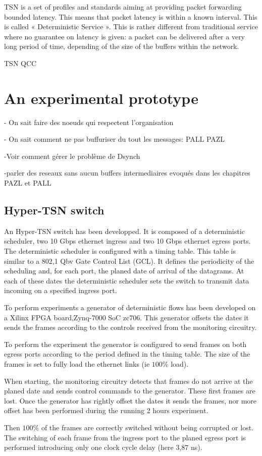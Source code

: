 \label{sec:TSNqbv}
 TSN is a set of profiles and standards aiming at providing packet forwarding bounded latency. This means that packet latency is within a known interval. This is called « Deterministic Service ». This is rather different from traditional service where no guarantee on latency is given: a packet can be delivered after a very long period of time, depending of the size of the buffers within the network.


 TSN QCC
\section{An experimental prototype}
\label{sec:platform}
- On sait faire des noeuds qui respectent l'organisation

- On sait comment ne pas buffuriser du tout les messages: PALL PAZL

-Voir comment gérer le problème de Dsynch

-parler des reseaux sans aucun buffers intermediaires evoqués dans les chapitres PAZL et PALL
\subsection{Hyper-TSN switch}

An Hyper-TSN switch has been developped. It is composed of a deterministic scheduler, two 10 Gbps ethernet ingress and two 10 Gbps ethernet egress ports. The deterministic scheduler is configured with a timing table. This table is similar to a 802,1 Qbv Gate Control List (GCL). It defines the periodicity of the scheduling and, for each port, the planed date of arrival of the datagrams. At each of these dates the deterministic scheduler sets the switch to transmit data incoming on a specified ingress port.

To perform experiments a generator of deterministic flows has been developed on a Xilinx FPGA board,Zynq-7000 SoC zc706. This generator offsets the dates it sends the frames according to the controls received from the monitoring circuitry.

To perform the experiment the generator is configured to send frames on both egress ports according to the period defined in the timing table. The size of the frames is set to fully load the ethernet links (ie $100\%$ load).

When starting, the monitoring circuitry detects that frames do not arrive at the planed date and sends control commands to the generator. These first frames are lost. Once the generator has rightly offset the dates it sends the frames, nor more offset has been performed during the running 2 hours experiment.

Then $100\%$ of the frames are correctly switched without being corrupted or lost. The switching of each frame from the ingress port to the planed egress port is performed introducing only one clock cycle delay (here 3,87 ns).
